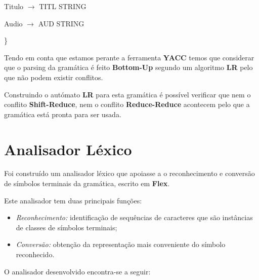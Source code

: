 \documentclass[11pt,a4paper]{report}
\begin{document}
\vspace{0.2cm}
\hspace{1.0cm} Titulo $\rightarrow$ TITL STRING

\vspace{0.2cm}
\hspace{1.0cm} Audio $\rightarrow$ AUD STRING


\hspace{0.7cm} \}

\vspace{0.5cm}

Tendo em conta que estamos perante a ferramenta \textbf{YACC} temos que considerar que o parsing da gramática é feito \textbf{Bottom-Up} segundo um algoritmo \textbf{LR} pelo que não podem existir conflitos.

Construindo o autómato \textbf{LR} para esta gramática é possível verificar que nem o conflito \textbf{Shift-Reduce}, nem o conflito \textbf{Reduce-Reduce} acontecem pelo que a gramática está pronta para ser usada.


\section{Analisador Léxico}

Foi construído um analisador léxico que apoiasse a o reconhecimento e conversão de símbolos terminais da gramática, escrito em \textbf{Flex}.

Este analisador tem duas principais funções:

\begin{itemize}
	\item \textit{Reconhecimento:} identificação de sequências de caracteres que são instâncias de classes de símbolos terminais;
	\item \textit{Conversão:} obtenção da representação mais conveniente do símbolo reconhecido.
\end{itemize}

O analisador desenvolvido encontra-se a seguir:

\vspace{0.5cm}
\end{document}
